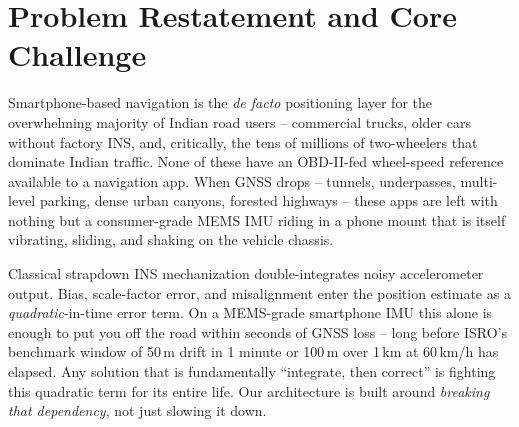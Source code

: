 \documentclass[10.5pt]{article}
\begin{document}
\tableofcontents
\thispagestyle{empty}
\newpage

\section{Problem Restatement and Core Challenge}

Smartphone-based navigation is the \emph{de facto} positioning layer for the overwhelming majority of Indian road users -- commercial trucks, older cars without factory INS, and, critically, the tens of millions of two-wheelers that dominate Indian traffic. None of these have an OBD-II-fed wheel-speed reference available to a navigation app. When GNSS drops -- tunnels, underpasses, multi-level parking, dense urban canyons, forested highways -- these apps are left with nothing but a consumer-grade MEMS IMU riding in a phone mount that is itself vibrating, sliding, and shaking on the vehicle chassis.

\begin{keyinsight}
Classical strapdown INS mechanization double-integrates noisy accelerometer output. Bias, scale-factor error, and misalignment enter the position estimate as a \emph{quadratic}-in-time error term. On a MEMS-grade smartphone IMU this alone is enough to put you off the road within seconds of GNSS loss -- long before ISRO's benchmark window of 50\,m drift in 1 minute or 100\,m over 1\,km at 60\,km/h has elapsed. Any solution that is fundamentally ``integrate, then correct'' is fighting this quadratic term for its entire life. Our architecture is built around \emph{breaking that dependency}, not just slowing it down.
\end{keyinsight}
\end{document}
